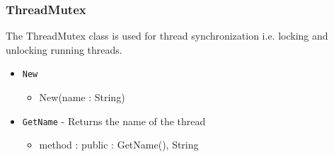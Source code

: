\documentclass[12pt]{article}
\begin{document}
\subsubsection{ThreadMutex}
The ThreadMutex class is used for thread synchronization i.e. locking
and unlocking running threads.   
\begin{itemize}
\item \texttt{New}
  \begin{itemize}
  \item New(name : String)
  \end{itemize}
\item \texttt{GetName} - Returns the name of the thread
  \begin{itemize}
  \item method : public : GetName(), String
  \end{itemize}  
\end{itemize}
\end{document}
